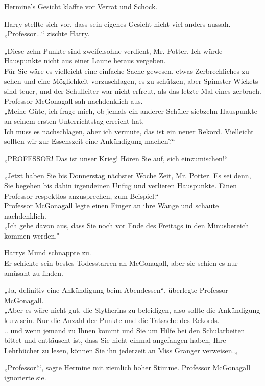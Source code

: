 {Hermine's Gesicht klaffte vor Verrat und Schock.

Harry stellte sich vor, dass sein eigenes Gesicht nicht viel anders aussah.\\ „Professor...“ zischte Harry.

„Diese zehn Punkte sind zweifelsohne verdient, Mr. Potter. Ich würde Hauspunkte nicht aus einer Laune heraus vergeben.\\ Für Sie wäre es vielleicht eine einfache Sache gewesen, etwas Zerbrechliches zu sehen und eine Möglichkeit vorzuschlagen, es zu schützen, aber Spimster-Wickets sind teuer, und der Schulleiter war nicht erfreut, als das letzte Mal eines zerbrach. Professor McGonagall sah nachdenklich aus.\\ „Meine Güte, ich frage mich, ob jemals ein anderer Schüler siebzehn Hauspunkte an seinem ersten Unterrichtstag erreicht hat.\\ Ich muss es nachschlagen, aber ich vermute, das ist ein neuer Rekord. Vielleicht sollten wir zur Essenszeit eine Ankündigung machen?“

„PROFESSOR! Das ist unser Krieg! Hören Sie auf, sich einzumischen!“

„Jetzt haben Sie bis Donnerstag nächster Woche Zeit, Mr. Potter. Es sei denn, Sie begehen bis dahin irgendeinen Unfug und verlieren Hauspunkte. Einen Professor respektlos anzusprechen, zum Beispiel.“\\ Professor McGonagall legte einen Finger an ihre Wange und schaute nachdenklich.\\ „Ich gehe davon aus, dass Sie noch vor Ende des Freitags in den Minusbereich kommen werden."

Harrys Mund schnappte zu.\\ Er schickte sein bestes Todesstarren an McGonagall, aber sie schien es nur amüsant zu finden.

„Ja, definitiv eine Ankündigung beim Abendessen“, überlegte Professor McGonagall.\\ „Aber es wäre nicht gut, die Slytherins zu beleidigen, also sollte die Ankündigung kurz sein. Nur die Anzahl der Punkte und die Tatsache des Rekords.\\ .. und wenn jemand zu Ihnen kommt und Sie um Hilfe bei den Schularbeiten bittet und enttäuscht ist, dass Sie nicht einmal angefangen haben, Ihre Lehrbücher zu lesen, können Sie ihn jederzeit an Miss Granger verweisen.„

„Professor!“, sagte Hermine mit ziemlich hoher Stimme. Professor McGonagall ignorierte sie.

}
